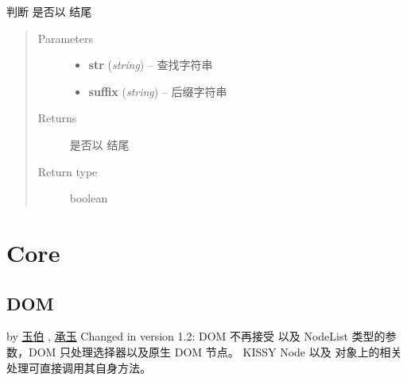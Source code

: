 \documentclass[letterpaper,10pt,english]{sphinxmanual}
\begin{document}
\begin{fulllineitems}
\label{api/seed/lang/endsWith:Lang.KISSY.endsWith}
判断  是否以  结尾
\begin{quote}\begin{description}
\item[{Parameters}] \leavevmode\begin{itemize}
\item {}
\textbf{str} (\emph{string}) -- 查找字符串

\item {}
\textbf{suffix} (\emph{string}) -- 后缀字符串

\end{itemize}

\item[{Returns}] \leavevmode
{} 是否以  结尾

\item[{Return type}] \leavevmode
boolean

\end{description}\end{quote}

\end{fulllineitems}



\section{Core}
\label{api/core/index:core}\label{api/core/index::doc}\label{api/core/index:kissy-core}\label{api/core/dom/index:module-DOM}

\subsection{DOM}
\label{api/core/dom/index::doc}\label{api/core/dom/index:dom}
by \href{mailto:lifesinger@gmail.com}{玉伯} , \href{mailto:yiminghe@gmail.com}{承玉}
Changed in version 1.2: DOM 不再接受  {\hyperref[api/core/node/index:module-Node]{}} 以及 NodeList 类型的参数，DOM 只处理选择器以及原生 DOM 节点。
KISSY Node 以及  {\hyperref[api/core/node/nodelist:Node.NodeList]{}} 对象上的相关处理可直接调用其自身方法。
\end{document}

